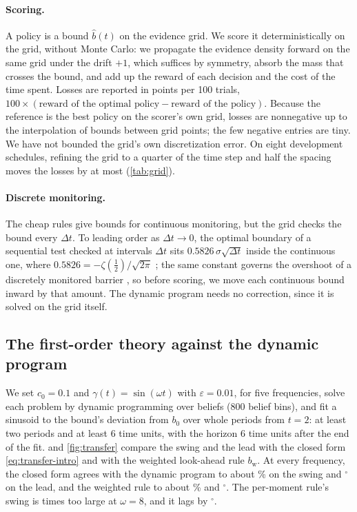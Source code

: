 \documentclass[11pt]{article}
\theoremstyle{definition}
\theoremstyle{remark}
\begin{document}
\paragraph{Scoring.}
A policy is a bound $\hat b(t)$ on the evidence grid. We score it deterministically on the grid,
without Monte Carlo: we propagate the evidence density forward on the same grid under the drift $+1$, which suffices
by symmetry, absorb the mass that
crosses the bound, and add up the reward of each decision and the cost of the time spent. Losses
are reported in points per 100 trials,
$100 \times (\text{reward of the optimal policy} - \text{reward of the policy})$. Because the
reference is the best policy on the scorer's own grid, losses are nonnegative up to the
interpolation of bounds between grid points; the few negative entries are tiny. We have not
bounded the grid's own discretization error. On eight development schedules, refining the grid to
a quarter of the time step and half the spacing moves the losses by at most \GridPmMaxChange{}
(\cref{tab:grid}).

\paragraph{Discrete monitoring.}
The cheap rules give bounds for continuous monitoring, but the grid checks the bound every
$\Delta t$. To leading order as $\Delta t \to 0$, the optimal boundary of a sequential test checked
at intervals $\Delta t$ sits $0.5826\,\sigma\sqrt{\Delta t}$ inside the continuous one, where
$0.5826 = -\zeta(\tfrac12)/\sqrt{2\pi}$ \citep{chernoff1965}; the same constant governs the
overshoot of a discretely monitored barrier \citep{siegmund1979,broadie1997}, so before
scoring, we move each continuous bound inward by that amount. The dynamic program needs no
correction, since it is solved on the grid itself.

\subsection{The first-order theory against the dynamic program}
\label{sec:sinusoid}

We set $c_0 = 0.1$ and $\gamma(t) = \sin(\omega t)$ with $\varepsilon = 0.01$, for five
frequencies, solve each problem by dynamic programming over beliefs (800 belief bins), and fit a
sinusoid to the bound's deviation from $b_0$ over whole periods from $t = 2$: at least two periods
and at least 6 time units, with the horizon 6 time units after the end of the fit.
 and \cref{fig:transfer} compare the swing and the lead with the closed form
\eqref{eq:transfer-intro} and with the weighted look-ahead rule $b_{\mathrm{w}}$. At every
frequency, the closed form agrees with the dynamic program to about \ClosedFormWorstGain\% on the
swing and \ClosedFormWorstLead$^\circ$ on the lead, and the weighted rule to about
\SinusoidWorstGain\% and \SinusoidWorstLead$^\circ$. The per-moment rule's swing is
\PerMomentTooLargeAtEight{} times too large at $\omega = 8$, and it lags by
\PerMomentLateAtEight$^\circ$.
\end{document}
